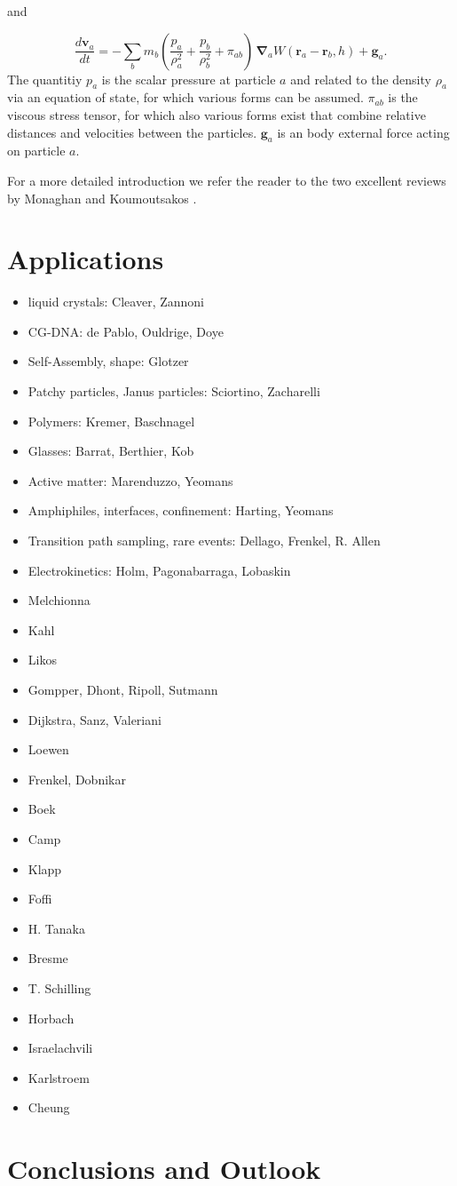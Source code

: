 \documentclass[8.5pt,twoside,twocolumn]{article}
\newcommand{\beq}{\begin{equation}}
\newcommand{\eeq}{\end{equation}}
\newcommand{\bit}{\begin{itemize}}
\newcommand{\eit}{\end{itemize}}
\begin{document}
and

\beq
\frac{d\mathbf{v}_a}{dt}=-\sum_b m_b (\frac{p_a}{\rho_a^2}+\frac{p_b}{\rho_b^2} + \pi_{a b})\,\mathbf{\nabla}_a W(\mathbf{r}_a-\mathbf{r}_b,h) + \mathbf{g}_a.
\eeq	
The quantitiy $p_a$ is the scalar pressure at particle $a$ and 
related to the density $\rho_a$ via an equation of state, for 
which various forms can be assumed. $\pi_{a b}$ is the viscous 
stress tensor, for which also various forms exist that combine
relative distances and velocities between the particles. $\mathbf{g}_a$ 
is an body external force acting on particle $a$.

For a more detailed introduction we refer the reader to the two
excellent reviews by Monaghan \cite{Monaghan:2012} and Koumoutsakos \cite{Koumoutsakos:2005}.


\section{Applications}

\bit
\item liquid crystals: Cleaver, Zannoni
\item CG-DNA: de Pablo, Ouldrige, Doye 
\item Self-Assembly, shape: Glotzer 
\item Patchy particles, Janus particles: Sciortino, Zacharelli 
\item Polymers: Kremer, Baschnagel
\item Glasses: Barrat, Berthier, Kob 
\item Active matter: Marenduzzo, Yeomans
\item Amphiphiles, interfaces, confinement: Harting, Yeomans 
\item Transition path sampling, rare events: Dellago, Frenkel, R. Allen
\item Electrokinetics: Holm, Pagonabarraga, Lobaskin
\item Melchionna
\item Kahl
\item Likos
\item Gompper, Dhont, Ripoll, Sutmann
\item Dijkstra, Sanz, Valeriani
\item Loewen
\item Frenkel, Dobnikar
\item Boek
\item Camp
\item Klapp
\item Foffi
\item H. Tanaka
\item Bresme
\item T. Schilling
\item Horbach
\item Israelachvili
\item Karlstroem
\item Cheung
\eit

\section{Conclusions and Outlook}



\footnotesize{
}
\end{document}
